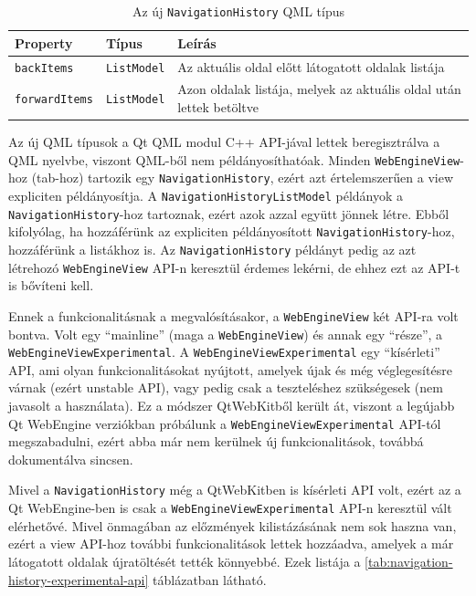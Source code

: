 \documentclass[12pt]{report}
\begin{document}
\begin{table}[ht!]
    \centering
    \begin{tabular}{ | l | l | p{238pt} | }
        \hline
        \textbf{Property} & \textbf{Típus} & \textbf{Leírás} \\ \hline

        \texttt{backItems} & \texttt{ListModel} &
        Az aktuális oldal előtt látogatott oldalak listája
        \\ \hline

        \texttt{forwardItems} & \texttt{ListModel} &
        Azon oldalak listája, melyek az aktuális oldal után lettek betöltve
        \\ \hline
    \end{tabular}
    \caption{
        \label{tab:navigation-history-history-api}
        Az új \texttt{NavigationHistory} QML típus
    }
\end{table}

Az új QML típusok a Qt QML modul C++ API-jával lettek beregisztrálva a QML nyelvbe, viszont
QML-ből nem példányosíthatóak. Minden \texttt{WebEngineView}-hoz (tab-hoz) tartozik egy
\texttt{NavigationHistory}, ezért azt értelemszerűen a view expliciten példányosítja.
A \texttt{NavigationHistoryListModel} példányok a \\
\texttt{NavigationHistory}-hoz tartoznak, ezért azok azzal együtt jönnek létre.
Ebből kifolyólag, ha hozzáférünk az expliciten példányosított \texttt{NavigationHistory}-hoz,
hozzáférünk a listákhoz is. Az \texttt{NavigationHistory} példányt pedig az azt létrehozó
\texttt{WebEngineView} API-n keresztül érdemes lekérni, de ehhez ezt az API-t is bővíteni
kell.

Ennek a funkcionalitásnak a megvalósításakor, a \texttt{WebEngineView} két API-ra volt
bontva. Volt egy ``mainline'' (maga a \texttt{WebEngineView}) és annak egy ``része'', a \\
\texttt{WebEngineViewExperimental}. A \texttt{WebEngineViewExperimental} egy ``kísérleti''
API, ami olyan funkcionalitásokat nyújtott, amelyek újak és még véglegesítésre várnak
(ezért unstable API), vagy pedig csak a teszteléshez szükségesek (nem javasolt a használata).
Ez a módszer QtWebKitből került át, viszont a legújabb Qt WebEngine verziókban
próbálunk a \texttt{WebEngineViewExperimental} API-tól megszabadulni, ezért abba már nem
kerülnek új funkcionalitások, továbbá dokumentálva sincsen.

Mivel a \texttt{NavigationHistory} még a QtWebKitben is kísérleti API volt, ezért az a
Qt WebEngine-ben is csak a \texttt{WebEngineViewExperimental} API-n keresztül vált
elérhetővé. Mivel önmagában az előzmények kilistázásának nem sok haszna van, ezért a view
API-hoz további funkcionalitások lettek hozzáadva, amelyek a már látogatott oldalak
újratöltését tették könnyebbé. Ezek listája a \ref{tab:navigation-history-experimental-api}
táblázatban látható.
\end{document}
